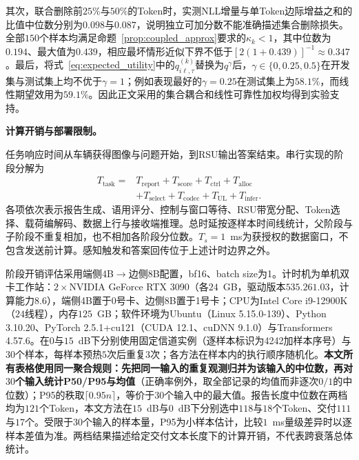 \documentclass[journal]{IEEEtran}
\begin{document}
其次，联合删除前$25\%$与$50\%$的Token时，实测NLL增量与单Token边际增益之和的比值中位数分别为$0.098$与$0.087$，说明独立可加分数不能准确描述集合删除损失。全部$150$个样本均满足命题~\ref{prop:coupled_approx}要求的$\kappa_k<1$，其中位数为$0.194$、最大值为$0.439$，相应最坏情形近似下界不低于$[2(1+0.439)]^{-1}\approx0.347$。最后，将式~\eqref{eq:expected_utility}中的$q_{i\ell,\tau}^{(k)}$替换为$q^\gamma$后，$\gamma\in\{0,0.25,0.5\}$在开发集与测试集上均不优于$\gamma=1$；例如表现最好的$\gamma=0.25$在测试集上为$58.1\%$，而线性期望效用为$59.1\%$。因此正文采用的集合耦合和线性可靠性加权均得到实验支持。

\textbf{计算开销与部署限制。}
\label{sec:exp-lat}

任务响应时间从车辆获得图像与问题开始，到RSU输出答案结束。串行实现的阶段分解为
\begin{equation}
\begin{split}
T_{\mathrm{task}}={}&T_{\mathrm{report}}+T_{\mathrm{score}}
+T_{\mathrm{ctrl}}+T_{\mathrm{alloc}}\\
&+T_{\mathrm{select}}+T_{\mathrm{codec}}
+T_{\mathrm{UL}}+T_{\mathrm{infer}}.
\end{split}
\label{eq:task_latency}
\end{equation}
各项依次表示报告生成、语用评分、控制与窗口等待、RSU带宽分配、Token选择、载荷编解码、数据上行与接收端推理。总时延按逐样本时间线统计，父阶段与子阶段不重复相加，也不相加各阶段分位数。$T_s=1$~ms为获授权的数据窗口，不包含发送前计算。感知触发和答案回传位于上述计时边界之外。

阶段开销评估采用端侧4B$\rightarrow$边侧8B配置，bf16、batch size为1。计时机为单机双卡工作站：$2\times$NVIDIA GeForce RTX 3090（各$24$~GB，驱动版本$535.261.03$，计算能力$8.6$），端侧4B置于0号卡、边侧8B置于1号卡；CPU为Intel Core i9-12900K（$24$线程），内存$125$~GB；软件环境为Ubuntu（Linux 5.15.0-139）、Python 3.10.20、PyTorch 2.5.1+cu121（CUDA 12.1、cuDNN 9.1.0）与Transformers 4.57.6。在$0$与$15$~dB下分别使用固定信道实例（逐样本标识为4242加样本序号）与$30$个样本，每样本预热$5$次后重复$3$次；各方法在样本内的执行顺序随机化。\textbf{本文所有表格使用同一聚合规则：先把同一输入的重复观测归并为该输入的中位数，再对$30$个输入统计P50/P95与均值}（正确率例外，取全部记录的均值而非逐次$0/1$的中位数）；P95的秩取$\lceil0.95n\rceil$，等价于$30$个输入中的最大值。报告长度中位数在两档均为$121$个Token，本文方法在$15$~dB与$0$~dB下分别选中$118$与$18$个Token、交付$111$与$17$个。受限于$30$个输入的样本量，P95为小样本估计，比较$1$~ms量级差异时以逐样本差值为准。两档结果描述给定交付文本长度下的计算开销，不代表跨衰落总体统计。
\end{document}
